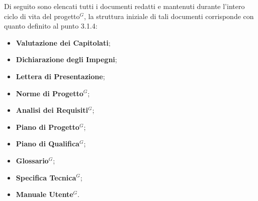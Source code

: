 \vspace{0.3em}
Di seguito sono elencati tutti i documenti redatti e mantenuti durante l'intero ciclo di vita del progetto$^G$, la struttura iniziale di tali documenti corrisponde con quanto definito al punto 3.1.4:
    \begin{itemize}[itemsep=3pt, parsep=1pt, label=$\scriptstyle\bullet$]
        \item \textbf{Valutazione dei Capitolati};
        \item \textbf{Dichiarazione degli Impegni};
        \item \textbf{Lettera di Presentazione};
        \item \textbf{Norme di Progetto$^G$};
        \item \textbf{Analisi dei Requisiti$^G$};
        \item \textbf{Piano di Progetto$^G$};
        \item \textbf{Piano di Qualifica$^G$};
        \item \textbf{Glossario$^G$};
        \item \textbf{Specifica Tecnica$^G$};
        \item \textbf{Manuale Utente$^G$}.
    \end{itemize}

